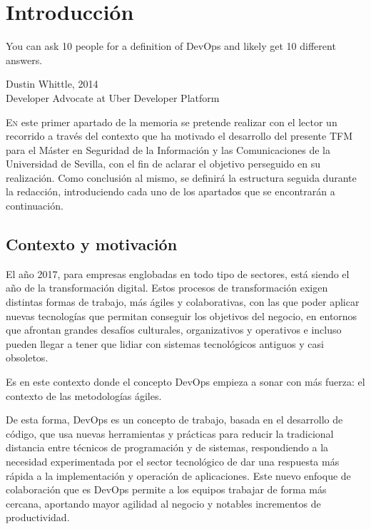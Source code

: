 \chapter{Introducción}\label{chp-01}
\epigraph{You can ask 10 people for a definition of DevOps and likely get 10 different answers.}{Dustin Whittle, 2014\\Developer Advocate at Uber Developer Platform}

\lettrine[lraise=-0.1, lines=2, loversize=0.2]{E}{n} este primer apartado de la memoria se pretende realizar con el lector un recorrido a través del contexto que ha motivado el desarrollo del presente \gls{TFM} para el Máster en Seguridad de la Información y las Comunicaciones  de la Universidad de Sevilla, con el fin de aclarar el objetivo perseguido en su realización. Como conclusión al mismo, se definirá la estructura seguida durante la redacción, introduciendo cada uno de los apartados que se encontrarán a continuación. 



\section{Contexto y motivación}

El año 2017, para empresas englobadas en todo tipo de sectores, está siendo el año de la transformación digital. Estos procesos de transformación exigen distintas formas de trabajo, más ágiles y colaborativas, con las que poder aplicar nuevas tecnologías que permitan conseguir los objetivos del negocio, en entornos que afrontan grandes desafíos culturales, organizativos y operativos e incluso pueden llegar a tener que lidiar con sistemas tecnológicos antiguos y casi obsoletos\cite{expansion2017}. 

Es en este contexto donde el concepto \gls{DevOps} empieza a sonar con más fuerza: el contexto de las metodologías ágiles. 

De esta forma, \gls{DevOps} es un concepto de trabajo, basada en el desarrollo de código, que usa nuevas herramientas y prácticas para reducir la tradicional distancia entre técnicos de programación y de sistemas, respondiendo a la necesidad experimentada por el sector tecnológico de dar una respuesta más rápida a la implementación y operación de aplicaciones. Este nuevo enfoque de colaboración que es \gls{DevOps} permite a los equipos trabajar de forma más cercana, aportando mayor agilidad al negocio y notables incrementos de productividad.


